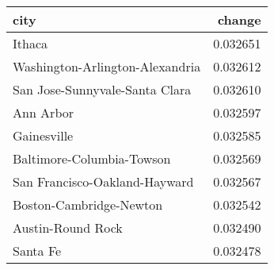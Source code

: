 \begin{tabular}{lr}
\toprule
city & change \\
\midrule
Ithaca & 0.032651 \\
Washington-Arlington-Alexandria & 0.032612 \\
San Jose-Sunnyvale-Santa Clara & 0.032610 \\
Ann Arbor & 0.032597 \\
Gainesville & 0.032585 \\
Baltimore-Columbia-Towson & 0.032569 \\
San Francisco-Oakland-Hayward & 0.032567 \\
Boston-Cambridge-Newton & 0.032542 \\
Austin-Round Rock & 0.032490 \\
Santa Fe & 0.032478 \\
\bottomrule
\end{tabular}
